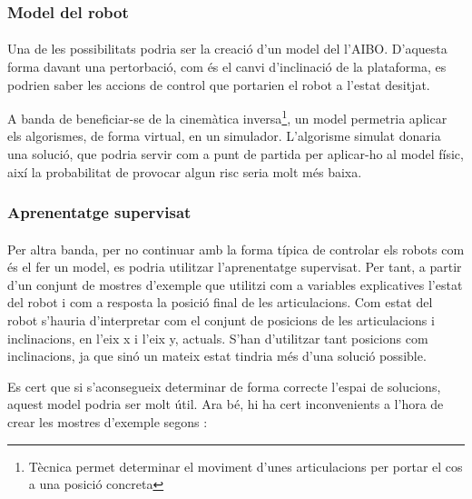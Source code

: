 \documentclass[12pt,a4paper,final,twoside]{article}
\begin{document}
\subsubsection{Model del robot}

\paragraph{}Una de les possibilitats podria ser la creació d'un model del l'AIBO. D'aquesta forma davant una pertorbació, com és el canvi d'inclinació de la plataforma, es podrien saber les accions de control que portarien el robot a l'estat desitjat.

A banda de beneficiar-se de la cinemàtica inversa\footnote{Tècnica permet determinar el moviment d'unes articulacions per portar el cos a una posició concreta}, un model permetria aplicar els algorismes, de forma virtual, en un simulador. L'algorisme simulat donaria una solució, que podria servir com a punt de partida per aplicar-ho al model físic, així la probabilitat de provocar algun risc seria molt més baixa.

\subsubsection{Aprenentatge supervisat}

\paragraph{}Per altra banda, per no continuar amb la forma típica de controlar els robots com és el fer un model, es podria utilitzar l'aprenentatge supervisat. Per tant, a partir d'un conjunt de mostres d'exemple que utilitzi com a variables explicatives l'estat del robot i com a resposta la posició final de les articulacions. Com estat del robot s'hauria d'interpretar com el conjunt de posicions de les articulacions i inclinacions, en l'eix x i l'eix y, actuals. S'han d'utilitzar tant posicions com inclinacions, ja que sinó un mateix estat tindria més d'una solució possible.

Es cert que si s'aconsegueix determinar de forma correcte l'espai de solucions, aquest model podria ser molt útil. Ara bé, hi ha cert inconvenients a l'hora de crear les mostres d'exemple segons \cite{Alpaydin2004}:
\end{document}
